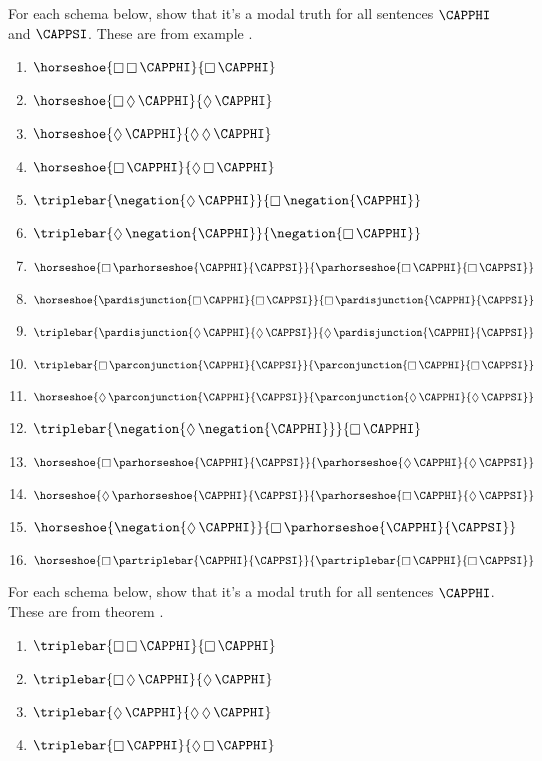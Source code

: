 For each schema below, show that it's a modal truth for all \MGSL{} sentences $\CAPPHI$ and $\CAPPSI$. 
These are from example .
\begin{multicols}{2}
\begin{enumerate}
\item $\horseshoe{\BOX\BOX\CAPPHI}{\BOX\CAPPHI}$
\item $\horseshoe{\BOX\DIAMOND\CAPPHI}{\DIAMOND\CAPPHI}$
\item $\horseshoe{\DIAMOND\CAPPHI}{\DIAMOND\DIAMOND\CAPPHI}$
\item $\horseshoe{\BOX\CAPPHI}{\DIAMOND\BOX\CAPPHI}$
\item $\triplebar{\negation{\DIAMOND\CAPPHI}}{\BOX\negation{\CAPPHI}}$
\item $\triplebar{\DIAMOND\negation{\CAPPHI}}{\negation{\BOX\CAPPHI}}$
\item $\horseshoe{\BOX\parhorseshoe{\CAPPHI}{\CAPPSI}}{\parhorseshoe{\BOX\CAPPHI}{\BOX\CAPPSI}}$
\item $\horseshoe{\pardisjunction{\BOX\CAPPHI}{\BOX\CAPPSI}}{\BOX\pardisjunction{\CAPPHI}{\CAPPSI}}$
\item $\triplebar{\pardisjunction{\DIAMOND\CAPPHI}{\DIAMOND\CAPPSI}}{\DIAMOND\pardisjunction{\CAPPHI}{\CAPPSI}}$
\item $\triplebar{\BOX\parconjunction{\CAPPHI}{\CAPPSI}}{\parconjunction{\BOX\CAPPHI}{\BOX\CAPPSI}}$
\item $\horseshoe{\DIAMOND\parconjunction{\CAPPHI}{\CAPPSI}}{\parconjunction{\DIAMOND\CAPPHI}{\DIAMOND\CAPPSI}}$
\item $\triplebar{\negation{\DIAMOND\negation{\CAPPHI}}}{\BOX\CAPPHI}$
\item $\horseshoe{\BOX\parhorseshoe{\CAPPHI}{\CAPPSI}}{\parhorseshoe{\DIAMOND\CAPPHI}{\DIAMOND\CAPPSI}}$
\item $\horseshoe{\DIAMOND\parhorseshoe{\CAPPHI}{\CAPPSI}}{\parhorseshoe{\BOX\CAPPHI}{\DIAMOND\CAPPSI}}$
\item $\horseshoe{\negation{\DIAMOND\CAPPHI}}{\BOX\parhorseshoe{\CAPPHI}{\CAPPSI}}$
\item $\horseshoe{\BOX\partriplebar{\CAPPHI}{\CAPPSI}}{\partriplebar{\BOX\CAPPHI}{\BOX\CAPPSI}}$
\end{enumerate}
\end{multicols}

For each schema below, show that it's a modal truth for all \MGSL{} sentences $\CAPPHI$. 
These are from theorem .
\begin{multicols}{2}
\begin{enumerate}
\item $\triplebar{\BOX\BOX\CAPPHI}{\BOX\CAPPHI}$
\item $\triplebar{\BOX\DIAMOND\CAPPHI}{\DIAMOND\CAPPHI}$
\item $\triplebar{\DIAMOND\CAPPHI}{\DIAMOND\DIAMOND\CAPPHI}$
\item $\triplebar{\BOX\CAPPHI}{\DIAMOND\BOX\CAPPHI}$
\end{enumerate}
\end{multicols}

